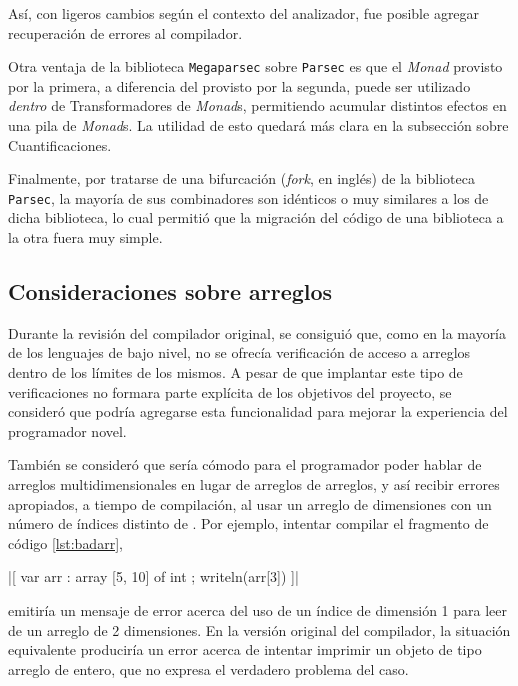 Así, con ligeros cambios según el contexto del analizador, fue posible agregar
recuperación de errores al compilador.

Otra ventaja de la biblioteca \texttt{Megaparsec} sobre \texttt{Parsec} es que
el \emph{Monad} provisto por la primera, a diferencia del provisto por la
segunda, puede ser utilizado \emph{dentro} de Transformadores de \emph{Monad}s,
permitiendo acumular distintos efectos en una pila de \emph{Monad}s. La utilidad
de esto quedará más clara en la subsección sobre Cuantificaciones.

Finalmente, por tratarse de una bifurcación (\emph{fork}, en inglés) de la
biblioteca \texttt{Parsec}, la mayoría de sus combinadores son idénticos o muy
similares a los de dicha biblioteca, lo cual permitió que la migración del
código de una biblioteca a la otra fuera muy simple.

\subsection{Consideraciones sobre arreglos}

Durante la revisión del compilador original, se consiguió que, como en la
mayoría de los lenguajes de bajo nivel, no se ofrecía verificación de acceso a
arreglos dentro de los límites de los mismos. A pesar de que implantar este tipo
de verificaciones no formara parte explícita de los objetivos del proyecto, se
consideró que podría agregarse esta funcionalidad para mejorar la experiencia
del programador novel.

También se consideró que sería cómodo para el programador poder hablar de
arreglos multidimensionales en lugar de arreglos de arreglos, y así recibir
errores apropiados, a tiempo de compilación, al usar un arreglo de 
dimensiones con un número de índices distinto de . Por ejemplo,
intentar compilar el fragmento de código \ref{lst:badarr},

\begin{gracielacode}[caption=Error en dimensiones de arreglo, label=lst:badarr]
|[ var arr : array [5, 10] of int
;  writeln(arr[3])
]|
\end{gracielacode}

emitiría un mensaje de error acerca del uso de un índice de dimensión 1 para
leer de un arreglo de 2 dimensiones. En la versión original del compilador, la
situación equivalente produciría un error acerca de intentar imprimir un objeto
de tipo arreglo de entero, que no expresa el verdadero problema del caso.

